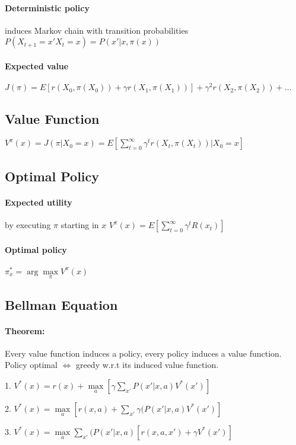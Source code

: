 \begin{multicols}{4}
\paragraph{Deterministic policy} induces Markov chain with transition probabilities $P(X_{t+1} = x'  X_t = x) = P(x'|x,\pi(x))$
\paragraph{Expected value} $J(\pi) = E[r(X_0,\pi(X_0)) + \gamma r(X_1, \pi(X_1))] + \gamma^2 r(X_2, \pi(X_2)) + \dots$

\subsection{Value Function}
$V^{\pi}(x) = J(\pi | X_0 = x) = E\left[\sum\limits_{t=0}^{\infty} \gamma^tr(X_t,\pi(X_t)) | X_0 = x\right]$

\subsection{Optimal Policy}
\paragraph{Expected utility} by executing $\pi$ starting in $x$ $V^\pi(x) = E \left[ \sum\limits_{t=0}^{\infty} \gamma^tR(x_t) \right]$
\paragraph{Optimal policy} $\pi^*_x = \arg\!\max\limits_\pi V^\pi(x)$

\subsection{Bellman Equation}
\paragraph{Theorem:} Every value function induces a policy, every policy induces a value function.
Policy optimal $\Leftrightarrow$ greedy w.r.t its induced value function.

1. $V^*(x) = r(x) + \max\limits_{a}\left[\gamma \sum\limits_{x'}P(x'| x,a) V^*(x')\right]$

2. $V^*(x) = \max\limits_{a} \left[r(x,a) + \sum\limits_{x'} \gamma (P(x'| x, a) V^*(x') \right]$

3. $V^*(x) = \max\limits_{a} \sum\limits_{x'} (P(x'| x, a) \left[r(x,a,x') + \gamma V^*(x') \right]$


\end{multicols}
